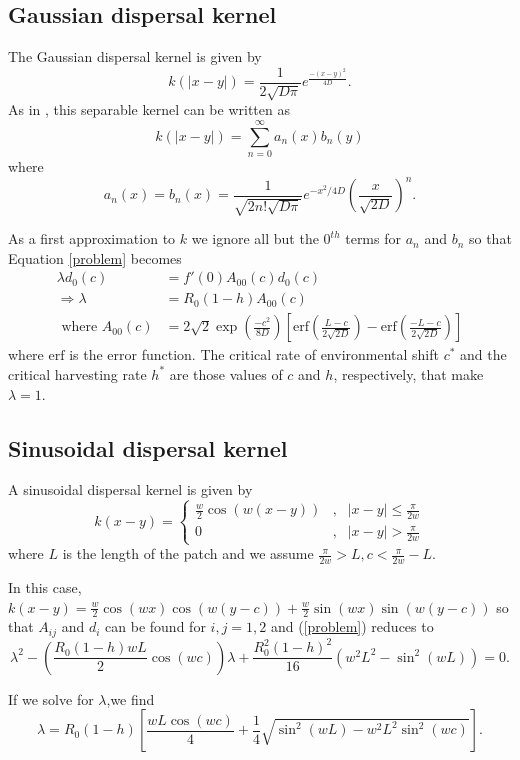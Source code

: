 \documentclass[12pt,english]{article}
\begin{document}
\begin{spacing}{1.9}
\begin{flushleft}
\subsection{Gaussian dispersal kernel }
The Gaussian dispersal kernel is given by
$$k(|x-y|)=\frac{1}{2\sqrt{D\pi}}e^{\frac{-(x-y)^2}{4D}}.$$
As in \citep{Latore:1998fk}, this separable kernel can be written as
$$k(|x-y|)=\sum_{n=0}^\infty a_n(x)b_n(y)$$
where
$$a_n(x)=b_n(x)=\frac{1}{\sqrt{2n!\sqrt{D\pi}}}e^{-x^2/4D}\left(\frac{x}{\sqrt{2D}}\right)^n.$$

As a first approximation to $k$ we ignore all but the $0^{th}$ terms for $a_n$ and $b_n$ so that Equation \ref{problem} becomes
\begin{align*}
\lambda d_0(c)&=f'(0)A_{00}(c)d_0(c)
\\ \Rightarrow \lambda&=R_0(1-h)A_{00}(c)
\\\text{ where } A_{00}(c)&=2\sqrt{2}\exp\left(\frac{-c^2}{8D}\right)\left[\text{erf}\left(\frac{L-c}{2\sqrt{2D}}\right)-\text{erf}\left(\frac{-L-c}{2\sqrt{2D}}\right)\right]
\end{align*}
where $\text{erf}$ is the error function.  The critical rate of environmental shift $c^*$ and the critical harvesting rate $h^*$ are those values of $c$ and $h$, respectively, that make $\lambda=1$.

\subsection{Sinusoidal dispersal kernel }
A sinusoidal dispersal kernel is given by 
$$k(x-y)=\left\{\begin{array}{ccccc}
\frac{w}{2}\cos(w(x-y)) & , & |x-y|\leq\frac{\pi}{2w}
\\ 0 & , & |x-y|>\frac{\pi}{2w}
\end{array}\right.
$$
where $L$ is the length of the patch and we assume $\frac{\pi}{2w}>L,c<\frac{\pi}{2w}-L$.

In this case, $k(x-y)=\frac{w}{2}\cos(wx)\cos(w(y-c))+\frac{w}{2}\sin(wx)\sin(w(y-c))$ so that $A_{ij}$ and $d_i$ can be found for $i,j=1,2$ and (\ref{problem}) reduces to 
$$\lambda^2-\left(\frac{R_0(1-h)wL}{2}\cos(wc)\right)\lambda+\frac{R_0^2(1-h)^2}{16}\left(w^2L^2-\sin^2(wL)\right)=0.$$

If we solve for $\lambda$,we find
\begin{equation} \lambda=R_0(1-h)\left[\frac{wL\cos(wc)}{4}+\frac{1}{4}\sqrt{\sin^2(wL)-w^2L^2\sin^2(wc)}\right]. \label{cosine} \end{equation}



\end{flushleft}
\end{spacing}
\end{document}
